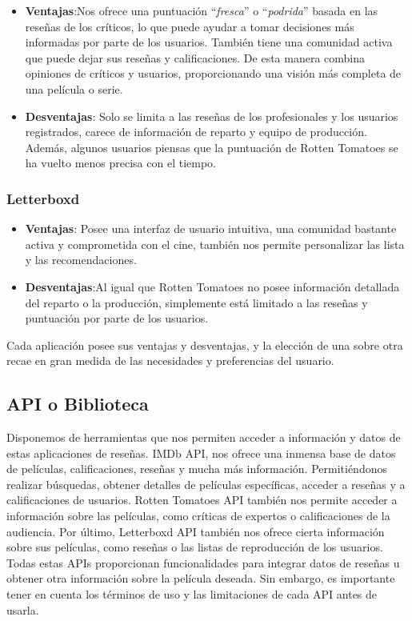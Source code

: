 \begin{itemize}
    \item \textbf{Ventajas}:Nos ofrece una puntuación ``\textit{fresca}'' o ``\textit{podrida}'' 
    basada  en las reseñas de los críticos, lo que puede ayudar a tomar decisiones más informadas por 
    parte de los usuarios. También tiene una comunidad activa que puede dejar sus reseñas y 
    calificaciones. De esta manera combina opiniones de críticos y usuarios, proporcionando una visión 
    más completa de una película o serie.
    \item \textbf{Desventajas}: Solo se limita a las reseñas de los profesionales y los usuarios 
    registrados, carece de información de reparto y equipo de producción. Además, algunos usuarios 
    piensas que la puntuación de Rotten Tomatoes se ha vuelto menos precisa con el tiempo.
\end{itemize}

\subsubsection{Letterboxd}

\begin{itemize}
    \item \textbf{Ventajas}: Posee una interfaz de usuario intuitiva, una comunidad bastante activa y 
    comprometida con el cine, también nos permite personalizar las lista y las recomendaciones.
    \item \textbf{Desventajas}:Al igual que Rotten Tomatoes no posee información detallada del reparto 
    o la producción, simplemente está limitado a las reseñas y puntuación por parte de los usuarios.
\end{itemize}

Cada aplicación posee sus ventajas y desventajas, y la elección de una sobre otra recae en gran medida 
de las necesidades y preferencias del usuario.

\subsection{API o Biblioteca}

Disponemos de herramientas que nos permiten acceder a información y datos de estas aplicaciones de 
reseñas. IMDb API, nos ofrece una inmensa base de datos de películas, calificaciones, reseñas y mucha 
más información. Permitiéndonos realizar búsquedas, obtener detalles de películas específicas, acceder 
a reseñas y a calificaciones de usuarios. Rotten Tomatoes API también nos permite acceder a 
información sobre las películas, como críticas de expertos o calificaciones de la audiencia. Por 
último, Letterboxd API también nos ofrece cierta información sobre sus películas, como reseñas o las 
listas de reproducción de los usuarios. Todas estas APIs proporcionan funcionalidades para integrar 
datos de reseñas u obtener otra información sobre la película deseada. Sin embargo, es importante 
tener en cuenta los términos de uso y las limitaciones de cada API antes de usarla.

